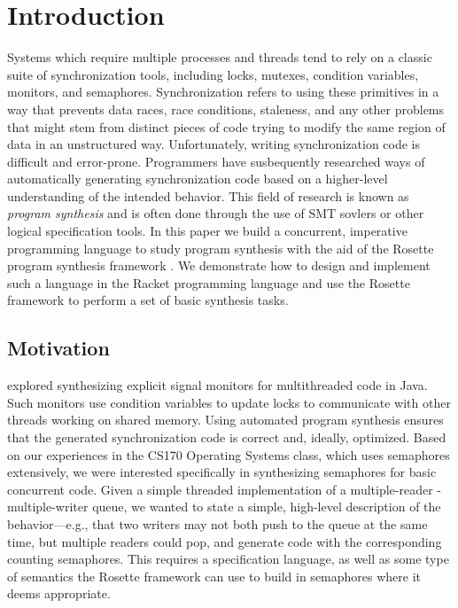 \section{Introduction}
Systems which require multiple processes and threads tend to rely on a classic suite of synchronization tools, including locks, mutexes, condition variables, monitors, and semaphores.  Synchronization refers to using these primitives in a way that prevents data races, race conditions, staleness, and any other problems that might stem from distinct pieces of code trying to modify the same region of data in an unstructured way.  Unfortunately, writing synchronization code is difficult and error-prone.  Programmers have susbequently researched ways of automatically generating synchronization code based on a higher-level understanding of the intended behavior.  This field of research is known as \emph{program synthesis} and is often done through the use of SMT sovlers or other logical specification tools.  In this paper we build a concurrent, imperative programming language to study program synthesis with the aid of the Rosette program synthesis framework \citep{torlak2014}.  We demonstrate how to design and implement such a language in the Racket programming language and use the Rosette framework to perform a set of basic synthesis tasks.

\subsection{Motivation}
\cite{ferles2018} explored synthesizing explicit signal monitors for multithreaded code in Java. Such monitors use condition variables to update locks to communicate with other threads working on shared memory. Using automated program synthesis ensures that the generated synchronization code is correct and, ideally, optimized.  Based on our experiences in the CS170 Operating Systems class, which uses semaphores extensively, we were interested specifically in synthesizing semaphores for basic concurrent code.  Given a simple threaded implementation of a multiple-reader -multiple-writer queue, we wanted to state a simple, high-level description of the behavior---e.g., that two writers may not both push to the queue at the same time, but multiple readers could pop, and generate code with the corresponding counting semaphores.  This requires a specification language, as well as some type of semantics the Rosette framework can use to build in semaphores where it deems appropriate.

